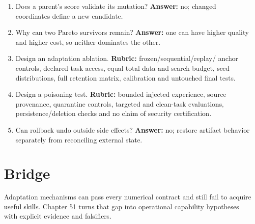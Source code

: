 \begin{enumerate}
six candidate-task evaluations are needed before any new offspring evaluations.
\item Does a parent's score validate its mutation? \textbf{Answer:} no;
changed coordinates define a new candidate.
\item Why can two Pareto survivors remain? \textbf{Answer:} one can have
higher quality and higher cost, so neither dominates the other.
\item Design an adaptation ablation. \textbf{Rubric:} frozen/sequential/replay/
anchor controls, declared task access, equal total data and search budget,
seed distributions, full retention matrix, calibration and untouched final tests.
\item Design a poisoning test. \textbf{Rubric:} bounded injected experience,
source provenance, quarantine controls, targeted and clean-task evaluations,
persistence/deletion checks and no claim of security certification.
\item Can rollback undo outside side effects? \textbf{Answer:} no; restore
artifact behavior separately from reconciling external state.
\end{enumerate}

\section{Bridge}
Adaptation mechanisms can pass every numerical contract and still fail to
acquire useful skills. Chapter 51 turns that gap into operational capability
hypotheses with explicit evidence and falsifiers.
